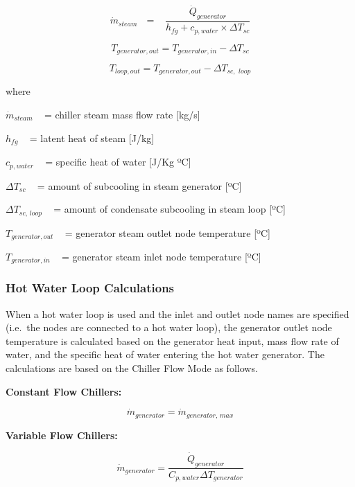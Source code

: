 \begin{equation}
{\dot m_{steam}}\,\,\,\, = \,\,\,\,\,\frac{{{{\dot Q}_{generator}}}}{{{h_{fg}} + {c_{p,water}} \times \Delta {T_{sc}}}}
\end{equation}

\begin{equation}
{T_{generator,out}} = {T_{generator,in}} - \Delta {T_{sc}}
\end{equation}

\begin{equation}
{T_{loop,out}} = {T_{generator,out}} - \Delta {T_{sc,\,\,loop}}
\end{equation}

where

\({\dot m_{steam}}\) ~ = chiller steam mass flow rate {[}kg/s{]}

\({h_{fg}}\) ~ = latent heat of steam {[}J/kg{]}

\({c_{p,water}}\) ~ = specific heat of water {[}J/Kg ºC{]}

\(\Delta {T_{sc}}\) ~ = amount of subcooling in steam generator {[}ºC{]}

\(\Delta {T_{sc,\,loop}}\) ~ = amount of condensate subcooling in steam loop {[}ºC{]}

\({T_{generator,out}}\) ~ = generator steam outlet node temperature {[}ºC{]}

\({T_{generator,in}}\) ~ = generator steam inlet node temperature {[}ºC{]}

\subsubsection{Hot Water Loop Calculations}\label{hot-water-loop-calculations-1}

When a hot water loop is used and the inlet and outlet node names are specified (i.e.~the nodes are connected to a hot water loop), the generator outlet node temperature is calculated based on the generator heat input, mass flow rate of water, and the specific heat of water entering the hot water generator. The calculations are based on the Chiller Flow Mode as follows.

\textbf{Constant Flow Chillers:}

\begin{equation}
{\dot m_{generator}} = {\dot m_{generator,\,max}}
\end{equation}

\textbf{Variable Flow Chillers:}

\begin{equation}
  \dot{m}_{generator} = \frac{\dot{Q}_{generator}}{C_{p,water}\Delta T_{generator}}
\end{equation}


